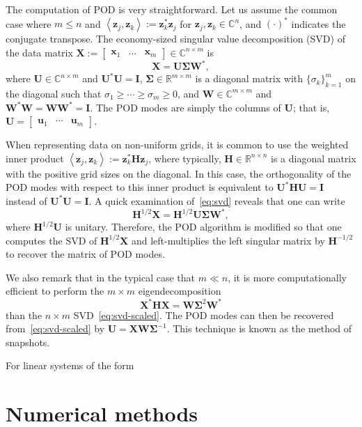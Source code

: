 \documentclass[11pt]{article}
\newcommand*{\Complex}{\mathbb{C}}
\newcommand*{\Reals}{\mathbb{R}}
\newcommand*{\half}{^{1/2}}
\newcommand*{\invhalf}{^{-1/2}}
\newcommand*{\ip}[2]{\left<#1, #2\right>}
\renewcommand*{\H}{\mathbf{H}}
\newcommand*{\I}{\mathbf{I}}
\newcommand*{\X}{\mathbf{X}}
\newcommand*{\U}{\mathbf{U}}
\newcommand*{\W}{\mathbf{W}}
\newcommand*{\SIGMA}{\mathbf{\Sigma}}
\renewcommand*{\u}{\mathbf{u}}
\newcommand*{\x}{\mathbf{x}}
\newcommand*{\z}{\mathbf{z}}
\begin{document}
The computation of POD is very straightforward.
Let us assume the common case where $m \le n$ and $\ip{\z_j}{\z_k} := \z_k^* \z_j$ for $\z_j, \z_k \in \Complex^n$, and $(\cdot)^*$ indicates the conjugate transpose.
The economy-sized singular value decomposition (SVD) of the data matrix $\X := \begin{bmatrix} \x_1 & \ldots & \x_m \end{bmatrix} \in \Complex^{n \times m}$ is
\begin{equation}
    \label{eq:svd}
    \X = \U \SIGMA \W^*,
\end{equation}
where $\U \in \Complex^{n \times m}$ and $\U^* \U = \I$, $\SIGMA \in \Reals^{m \times m}$ is a diagonal matrix with $\{\sigma_k\}_{k=1}^m$ on the diagonal such that $\sigma_1 \ge \cdots \ge \sigma_m \ge 0$, and $\W \in \Complex^{m \times m}$ and $\W^* \W = \W \W^* = \I$.
The POD modes are simply the columns of $\U$; that is, $\U = \begin{bmatrix} \u_1 & \cdots & \u_m \end{bmatrix}$.

When representing data on non-uniform grids, it is common to use the weighted inner product $\ip{\z_j}{\z_k} := \z_k^* \H \z_j$, where typically, $\H \in \Reals^{n \times n}$ is a diagonal matrix with the positive grid sizes on the diagonal.
In this case, the orthogonality of the POD modes with respect to this inner product is equivalent to $\U^* \H \U = \I$ instead of $\U^* \U = \I$.
A quick examination of~\eqref{eq:svd} reveals that one can write
\begin{equation}
    \label{eq:svd-scaled}
    \H\half \X = \H\half \U \SIGMA \W^*,
\end{equation}
where $\H\half \U$ is unitary.
Therefore, the POD algorithm is modified so that one computes the SVD of $\H\half \X$ and left-multiplies the left singular matrix by $\H\invhalf$ to recover the matrix of POD modes.

We also remark that in the typical case that $m \ll n$, it is more computationally efficient to perform the $m \times m$ eigendecomposition
\begin{equation}
    \X^* \H \X = \W \SIGMA^2 \W^*
\end{equation}
than the $n \times m$ SVD~\eqref{eq:svd-scaled}.
The POD modes can then be recovered from~\eqref{eq:svd-scaled} by $\U = \X \W \SIGMA^{-1}$.
This technique is known as the method of snapshots.

For linear systems of the form 

\section{Numerical methods}
\label{sec:methods}
\end{document}
